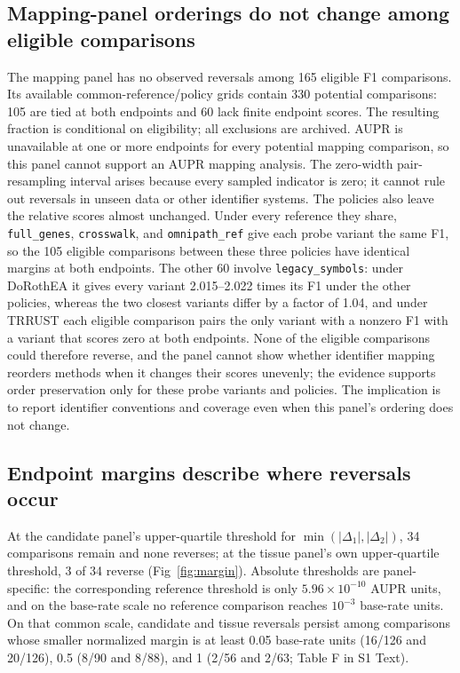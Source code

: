 \documentclass[10pt,letterpaper]{article}
\begin{document}
\subsection*{Mapping-panel orderings do not change among eligible comparisons}
The mapping panel has no observed reversals among 165 eligible F1 comparisons. Its available common-reference/policy grids contain 330 potential comparisons: 105 are tied at both endpoints and 60 lack finite endpoint scores. The resulting fraction is conditional on eligibility; all exclusions are archived. AUPR is unavailable at one or more endpoints for every potential mapping comparison, so this panel cannot support an AUPR mapping analysis. The zero-width pair-resampling interval arises because every sampled indicator is zero; it cannot rule out reversals in unseen data or other identifier systems. The policies also leave the relative scores almost unchanged. Under every reference they share, \texttt{full\_genes}, \texttt{crosswalk}, and \texttt{omnipath\_ref} give each probe variant the same F1, so the 105 eligible comparisons between these three policies have identical margins at both endpoints. The other 60 involve \texttt{legacy\_symbols}: under DoRothEA it gives every variant 2.015--2.022 times its F1 under the other policies, whereas the two closest variants differ by a factor of 1.04, and under TRRUST each eligible comparison pairs the only variant with a nonzero F1 with a variant that scores zero at both endpoints. None of the eligible comparisons could therefore reverse, and the panel cannot show whether identifier mapping reorders methods when it changes their scores unevenly; the evidence supports order preservation only for these probe variants and policies. The implication is to report identifier conventions and coverage even when this panel's ordering does not change.

\subsection*{Endpoint margins describe where reversals occur}
At the candidate panel's upper-quartile threshold for $\min(|\Delta_1|,|\Delta_2|)$, 34 comparisons remain and none reverses; at the tissue panel's own upper-quartile threshold, 3 of 34 reverse (Fig~\ref{fig:margin}). Absolute thresholds are panel-specific: the corresponding reference threshold is only $5.96\times10^{-10}$ AUPR units, and on the base-rate scale no reference comparison reaches $10^{-3}$ base-rate units. On that common scale, candidate and tissue reversals persist among comparisons whose smaller normalized margin is at least 0.05 base-rate units (16/126 and 20/126), 0.5 (8/90 and 8/88), and 1 (2/56 and 2/63; Table F in S1 Text).
\end{document}
